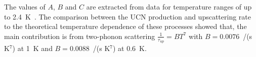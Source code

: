 The values of $A$, $B$ and $C$ are extracted from data for temperature
ranges of up to 2.4~K~\cite{Leung2016}. The comparison between the UCN
production and upscattering rate to the theoretical temperature
dependence of these processes showed that, the main contribution is
from two-phonon scattering $\frac{1}{\tau_{up}}=BT^7$ with
$B = 0.0076$~/(s K$^7$) at 1~K and $B = 0.0088$~/(s K$^7$) at
0.6~K\cite{Leung2016}.












